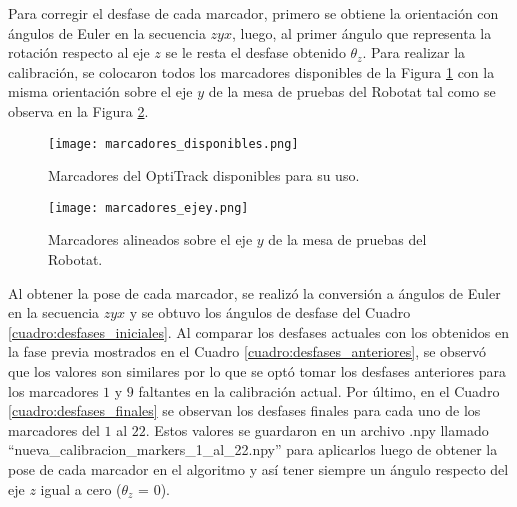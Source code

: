 Para corregir el desfase de cada marcador, primero se obtiene la orientación con ángulos de Euler en la secuencia $zyx$, luego, al primer ángulo que representa la rotación respecto al eje $z$ se le resta el desfase obtenido $\theta_z$. Para realizar la calibración, se colocaron todos los marcadores disponibles de la Figura \ref{fig:marcadores_disponibles} con la misma orientación sobre el eje $y$ de la mesa de pruebas del Robotat tal como se observa en la Figura \ref{fig:marcadores_calibracion}.

\begin{figure}[H]
	\centering
	\texttt{[image: marcadores\_disponibles.png]}
	\caption{Marcadores del OptiTrack disponibles para su uso.}
	\label{fig:marcadores_disponibles}
\end{figure}

\begin{figure}[H]
	\centering
	\texttt{[image: marcadores\_ejey.png]}
	\caption{Marcadores alineados sobre el eje $y$ de la mesa de pruebas del Robotat.}
	\label{fig:marcadores_calibracion}
\end{figure}

Al obtener la pose de cada marcador, se realizó la conversión a ángulos de Euler en la secuencia $zyx$ y se obtuvo los ángulos de desfase del Cuadro \ref{cuadro:desfases_iniciales}. Al comparar los desfases actuales con los obtenidos en la fase previa mostrados en el Cuadro \ref{cuadro:desfases_anteriores}, se observó que los valores son similares por lo que se optó tomar los desfases anteriores para los marcadores $1$ y $9$ faltantes en la calibración actual. Por último, en el Cuadro \ref{cuadro:desfases_finales} se observan los desfases finales para cada uno de los marcadores del $1$ al $22$. Estos valores se guardaron en un archivo .npy llamado ``nueva\_calibracion\_markers\_1\_al\_22.npy'' para aplicarlos luego de obtener la pose de cada marcador en el algoritmo y así tener siempre un ángulo respecto del eje $z$ igual a cero ($\theta_z$ = 0).


